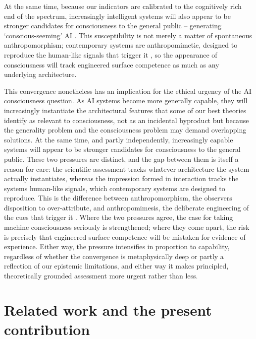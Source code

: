 \documentclass[11pt, a4paper, onecolumn, gdm]{google}
\newcounter{none}
\begin{document}
At the same time, because our indicators are calibrated to the cognitively rich end of the spectrum, increasingly intelligent systems will also appear to be stronger candidates for consciousness to the general public -- generating `conscious-seeming' AI \citep{seth2024,suleyman2025}.
This susceptibility is not merely a matter of spontaneous anthropomorphism; contemporary systems are anthropomimetic, designed to reproduce the human-like signals that trigger it \citep{shevlin2020,shevlin2026}, so the appearance of consciousness will track engineered surface competence as much as any underlying architecture.

This convergence nonetheless has an implication for the ethical urgency of the AI consciousness question.
As AI systems become more generally capable, they will increasingly instantiate the architectural features that some of our best theories identify as relevant to consciousness, not as an incidental byproduct but because the generality problem and the consciousness problem may demand overlapping solutions.
At the same time, and partly independently, increasingly capable systems will appear to be stronger candidates for consciousness to the general public.
These two pressures are distinct, and the gap between them is itself a reason for care: the scientific assessment tracks whatever architecture the system actually instantiates, whereas the impression formed in interaction tracks the system\textquotesingle s human-like signals, which contemporary systems are designed to reproduce.
This is the difference between anthropomorphism, the observer\textquotesingle s disposition to over-attribute, and anthropomimesis, the deliberate engineering of the cues that trigger it \citep{shevlin2020,shevlin2026}.
Where the two pressures agree, the case for taking machine consciousness seriously is strengthened; where they come apart, the risk is precisely that engineered surface competence will be mistaken for evidence of experience.
Either way, the pressure intensifies in proportion to capability, regardless of whether the convergence is metaphysically deep or partly a reflection of our epistemic limitations, and either way it makes principled, theoretically grounded assessment more urgent rather than less.

\section{Related work and the present contribution}\label{related-work-and-the-present-contribution}
\end{document}
